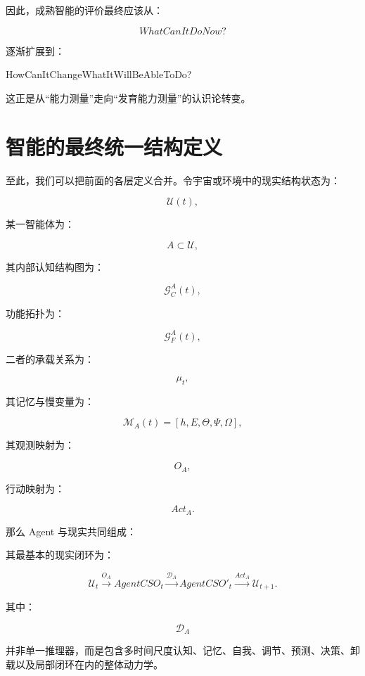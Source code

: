 因此，成熟智能的评价最终应该从：

\[
WhatCanItDoNow?
\]

逐渐扩展到：

\begin{statementbox}
HowCanItChangeWhatItWillBeAbleToDo?
\end{statementbox}

这正是从“能力测量”走向“发育能力测量”的认识论转变。

\section{智能的最终统一结构定义}

至此，我们可以把前面的各层定义合并。令宇宙或环境中的现实结构状态为：

\[
\mathcal U(t),
\]

某一智能体为：

\[
A\subset\mathcal U,
\]

其内部认知结构图为：

\[
\mathcal G_C^A(t),
\]

功能拓扑为：

\[
\mathcal G_F^A(t),
\]

二者的承载关系为：

\[
\mu_t,
\]

其记忆与慢变量为：

\[
\mathcal M_A(t)
=
[h,E,\Theta,\Psi,\Omega],
\]

其观测映射为：

\[
O_A,
\]

行动映射为：

\[
Act_A.
\]

那么 Agent 与现实共同组成：

\begin{statementbox}
\centering
{}
\end{statementbox}

其最基本的现实闭环为：

\[
\mathcal U_t
\xrightarrow{O_A}
AgentCSO_t
\xrightarrow{\mathcal D_A}
AgentCSO'_t
\xrightarrow{Act_A}
\mathcal U_{t+1}.
\]

其中：

\[
\mathcal D_A
\]

并非单一推理器，而是包含多时间尺度认知、记忆、自我、调节、预测、决策、卸载以及局部闭环在内的整体动力学。

